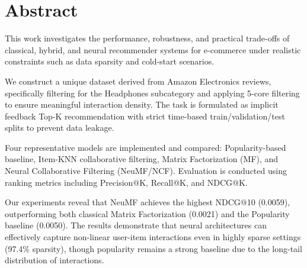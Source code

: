 %
%
\chapter{Abstract}
\begin{SingleSpace}
This work investigates the performance, robustness, and practical trade-offs of classical, hybrid, and neural recommender systems for e-commerce under realistic constraints such as data sparsity and cold-start scenarios.

We construct a unique dataset derived from Amazon Electronics reviews, specifically filtering for the Headphones subcategory and applying 5-core filtering to ensure meaningful interaction density. The task is formulated as implicit feedback Top-K recommendation with strict time-based train/validation/test splits to prevent data leakage.

Four representative models are implemented and compared: Popularity-based baseline, Item-KNN collaborative filtering, Matrix Factorization (MF), and Neural Collaborative Filtering (NeuMF/NCF). Evaluation is conducted using ranking metrics including Precision@K, Recall@K, and NDCG@K.

Our experiments reveal that NeuMF achieves the highest NDCG@10 (0.0059), outperforming both classical Matrix Factorization (0.0021) and the Popularity baseline (0.0050). The results demonstrate that neural architectures can effectively capture non-linear user-item interactions even in highly sparse settings (97.4\% sparsity), though popularity remains a strong baseline due to the long-tail distribution of interactions.


\end{SingleSpace}
